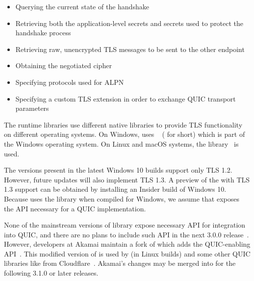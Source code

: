\begin{itemize}

  \item Querying the current state of the handshake

  \item Retrieving both the application-level secrets and secrets used to protect the handshake process

  \item Retrieving raw, unencrypted TLS messages to be sent to the other endpoint

  \item Obtaining the negotiated cipher

  \item Specifying protocols used for ALPN

  \item Specifying a custom TLS extension in order to exchange QUIC transport parameters

\end{itemize}

The \dotnet{} runtime libraries use different native libraries to provide TLS functionality on
different operating systems. On Windows, \dotnet{} uses ~\cite{Schannel}
(\libschannel{} for short) which is part of the Windows operating system. On Linux and macOS
systems, the \libopenssl{} library~\cite{OpenSSLWeb} is used.

\begin{description}

     The \libschannel{} versions present in the latest Windows 10
builds support only TLS 1.2. However, future updates will also implement TLS 1.3. A preview of the
\libschannel{} with TLS 1.3 support can be obtained by installing an Insider build of Windows 10.
Because \libmsquic{} uses the \libschannel{} library when compiled for Windows, we assume that
\libschannel{} exposes the API necessary for a QUIC implementation.

    \ditem{\libopenssl{}} None of the mainstream versions of \libopenssl{} library expose necessary
API for integration into QUIC, and there are no plans to include such API in the next \libopenssl{}
3.0.0 release~\cite{OpensslBlogNoQuic}. However, developers at Akamai maintain a fork of
\libopenssl{} which adds the QUIC-enabling API~\cite{AkamaiOpensslGithub}. This modified version of
\libopenssl{} is used by \libmsquic{} (in Linux builds) and some other QUIC libraries like
 from Cloudflare~\cite{quicheGithub}. Akamai's changes may be merged into
\libopenssl{} for the following 3.1.0 or later releases.

\end{description}

